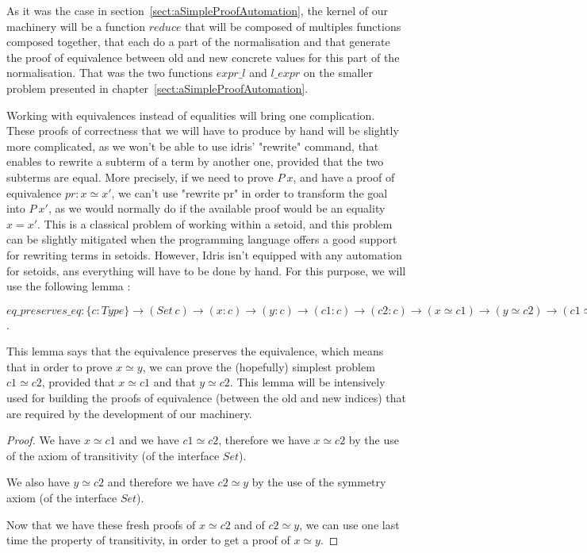 As it was the case in section~\ref{sect:aSimpleProofAutomation}, the kernel of our machinery will be a function $reduce$ that will be composed of multiples functions composed together, that each do a part of the normalisation and that generate the proof of equivalence between old and new concrete values for this part of the normalisation. That was the two functions $expr\_l$ and $l\_expr$ on the smaller problem presented in chapter~\ref{sect:aSimpleProofAutomation}.

Working with equivalences instead of equalities will bring one complication. These proofs of correctness that we will have to produce by hand will be slightly more complicated, as we won't be able to use idris' "rewrite" command, that enables to rewrite a subterm of a term by another one, provided that the two subterms are equal. More precisely, if we need to prove $P\ x$, and have a proof of equivalence $pr:x \simeq x'$, we can't use "rewrite pr" in order to transform the goal into $P\ x'$, as we would normally do if the available proof would be an equality $x=x'$. This is a classical problem of working within a setoid, and this problem can be slightly mitigated when the programming language offers a good support for rewriting terms in setoids. However, Idris isn't equipped with any automation for setoids, ans everything will have to be done by hand. For this purpose, we will use the following lemma :

$eq\_preserves\_eq : \{c:Type\} \rightarrow (Set\ c) \rightarrow (x:c) \rightarrow (y:c) \rightarrow (c1:c) \rightarrow (c2:c) \rightarrow (x \simeq c1) \rightarrow (y \simeq c2) \rightarrow (c1 \simeq c2) \rightarrow (x \simeq y)$.

This lemma says that the equivalence preserves the equivalence, which means that in order to prove $x \simeq y$, we can prove the (hopefully) simplest problem $c1 \simeq c2$, provided that $x \simeq c1$ and that $y \simeq c2$. This lemma will be intensively used for building the proofs of equivalence (between the old and new indices) that are required by the development of our machinery.

\begin{proof}
We have $x \simeq c1$ and we have $c1 \simeq c2$, therefore we have $x \simeq c2$ by the use of the axiom of transitivity (of the interface $Set$). \

We also have $y \simeq c2$ and therefore we have $c2 \simeq y$ by the use of the symmetry axiom (of the interface $Set$). \

Now that we have these fresh proofs of $x \simeq c2$ and of $c2 \simeq y$, we can use one last time the property of transitivity, in order to get a proof of $x \simeq y$.

\end{proof}


